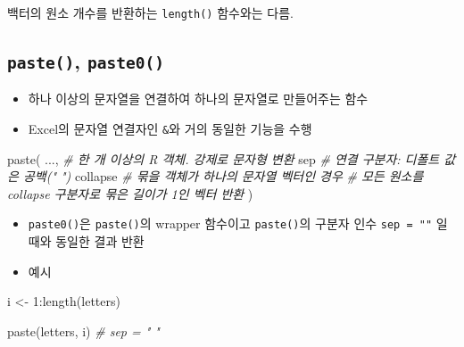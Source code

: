 \documentclass[
  11pt,
]{krantz}
\makeatletter
\newenvironment{Shaded}{\begin{snugshade}}{\end{snugshade}}
\newcommand{\CommentTok}[1]{\textcolor[rgb]{0.37,0.37,0.37}{\textit{#1}}}
\newcommand{\DecValTok}[1]{\textcolor[rgb]{0.06,0.06,0.06}{#1}}
\newcommand{\FunctionTok}[1]{\textcolor[rgb]{0,0,0}{#1}}
\newcommand{\NormalTok}[1]{#1}
\newcommand{\OtherTok}[1]{\textcolor[rgb]{0.37,0.37,0.37}{#1}}
\newcommand{\SpecialCharTok}[1]{\textcolor[rgb]{0,0,0}{#1}}
\providecommand{\tightlist}{%
  \setlength{\itemsep}{0pt}\setlength{\parskip}{0pt}}
\newenvironment{kframe}{%
\medskip{}
\setlength{\fboxsep}{.8em}
 \def\at@end@of@kframe{}%
 \ifinner\ifhmode%
  \def\at@end@of@kframe{\end{minipage}}%
  \begin{minipage}{\columnwidth}%
 \fi\fi%
 \def\FrameCommand##1{\hskip\@totalleftmargin \hskip-\fboxsep
 \colorbox{shadecolor}{##1}\hskip-\fboxsep
     \hskip-\linewidth \hskip-\@totalleftmargin \hskip\columnwidth}%
 \MakeFramed {\advance\hsize-\width
   \@totalleftmargin\z@ \linewidth\hsize
   \@setminipage}}%
 {\par\unskip\endMakeFramed%
 \at@end@of@kframe}
\newenvironment{rmdblock}[1]
  {
  \begin{itemize}
  \renewcommand{\labelitemi}{
    \raisebox{-.7\height}[0pt][0pt]{
      {\setkeys{Gin}{width=3em,keepaspectratio}\texttt{[image: images/\#1]}}
    }
  }
  \setlength{\fboxsep}{1em}
  \begin{kframe}
  \item
  }
  {
  \end{kframe}
  \end{itemize}
  }
\newenvironment{rmdwarning}
  {\begin{rmdblock}{warning}}
  {\end{rmdblock}}
\makeatother
\begin{document}
\normalsize

\footnotesize

\begin{rmdwarning}
백터의 원소 개수를 반환하는 \texttt{length()} 함수와는 다름.
\end{rmdwarning}

\normalsize

\hypertarget{paste}{%
\subsection{\texorpdfstring{\textbf{\texttt{paste()}}, \textbf{\texttt{paste0()}}}{paste(), paste0()}}\label{paste}}

\begin{itemize}
\tightlist
\item
  하나 이상의 문자열을 연결하여 하나의 문자열로 만들어주는 함수
\item
  Excel의 문자열 연결자인 \texttt{\&}와 거의 동일한 기능을 수행
\end{itemize}

\footnotesize

\begin{Shaded}
\begin{Highlighting}[]
\FunctionTok{paste}\NormalTok{(}
\NormalTok{  ..., }\CommentTok{\# 한 개 이상의 R 객체. 강제로 문자형 변환}
\NormalTok{  sep  }\CommentTok{\# 연결 구분자: 디폴트 값은 공백(" ")}
\NormalTok{  collapse }\CommentTok{\# 묶을 객체가 하나의 문자열 벡터인 경우}
           \CommentTok{\# 모든 원소를 collapse 구분자로 묶은 길이가 1인 벡터 반환}
\NormalTok{)}
\end{Highlighting}
\end{Shaded}

\normalsize

\begin{itemize}
\tightlist
\item
  \texttt{paste0()}은 \texttt{paste()}의 wrapper 함수이고 \texttt{paste()}의 구분자 인수 \texttt{sep\ =\ ""} 일 때와 동일한 결과 반환
\item
  예시
\end{itemize}

\footnotesize

\begin{Shaded}
\begin{Highlighting}[]
\NormalTok{i }\OtherTok{\textless{}{-}} \DecValTok{1}\SpecialCharTok{:}\FunctionTok{length}\NormalTok{(letters)}

\FunctionTok{paste}\NormalTok{(letters, i) }\CommentTok{\# sep = " "}
\end{Highlighting}
\end{Shaded}
\end{document}
